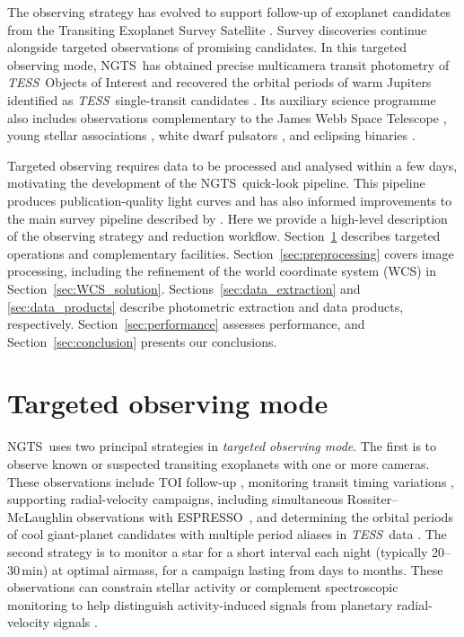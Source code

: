 \documentclass[fleqn,usenatbib]{mnras}
\newcommand{\ngts}{{NGTS}}
\newcommand{\tess}{{\it TESS}}
\newcommand{\jwst}{{\it JWST}}
\newcommand{\espresso}{ESPRESSO}
\begin{document}
The observing strategy has evolved to support follow-up of exoplanet candidates from the Transiting Exoplanet Survey Satellite \citep[\tess;][]{Ricker15}. Survey discoveries continue alongside targeted observations of promising candidates. In this targeted observing mode, \ngts\ has obtained precise multicamera transit photometry of \tess\ Objects of Interest \citep[TOIs; e.g.][]{2020MNRAS.494.5872B,2020Natur.583...39A,2022MNRAS.514.1606B} and recovered the orbital periods of warm Jupiters identified as \tess\ single-transit candidates \citep{2020ApJ...898L..11G}. Its auxiliary science programme also includes observations complementary to the James Webb Space Telescope \citep[\jwst; e.g. WASP-39;][]{2023Natur.614..653A}, young stellar associations \citep{2023MNRAS.523..169S}, white dwarf pulsators \citep{2021MNRAS.502..581C}, and eclipsing binaries \citep{2020MNRAS.491.1548G}.

Targeted observing requires data to be processed and analysed within a few days, motivating the development of the \ngts\ quick-look pipeline. This pipeline produces publication-quality light curves and has also informed improvements to the main survey pipeline described by \citet{2018MNRAS.475.4476W}. Here we provide a high-level description of the observing strategy and reduction workflow. Section~\ref{sec:targeted_observing_mode} describes targeted operations and complementary facilities. Section~\ref{sec:preprocessing} covers image processing, including the refinement of the world coordinate system (WCS) in Section~\ref{sec:WCS_solution}. Sections~\ref{sec:data_extraction} and \ref{sec:data_products} describe photometric extraction and data products, respectively. Section~\ref{sec:performance} assesses performance, and Section~\ref{sec:conclusion} presents our conclusions.

\section{Targeted observing mode}\label{sec:targeted_observing_mode}

\ngts\ uses two principal strategies in \textit{targeted observing mode}. The first is to observe known or suspected transiting exoplanets with one or more cameras. These observations include TOI follow-up \citep[e.g.][]{2020MNRAS.494.5872B,2020Natur.583...39A,2022MNRAS.514.1606B}, monitoring transit timing variations \citep[e.g.][]{2022MNRAS.510.5464K,2024A&A...688A.211L}, supporting radial-velocity campaigns, including simultaneous Rossiter--McLaughlin observations with \espresso\ \citep{2022MNRAS.516..298D,2023MNRAS.522.4499D}, and determining the orbital periods of cool giant-planet candidates with multiple period aliases in \tess\ data \citep[e.g.][]{2020MNRAS.491.1548G,2020ApJ...898L..11G}. The second strategy is to monitor a star for a short interval each night (typically 20--30\,min) at optimal airmass, for a campaign lasting from days to months. These observations can constrain stellar activity or complement spectroscopic monitoring to help distinguish activity-induced signals from planetary radial-velocity signals \citep{2023Natur.614..653A}.
\end{document}
